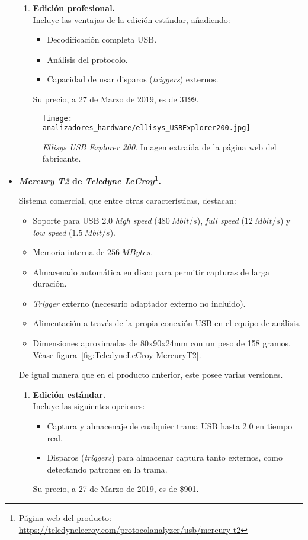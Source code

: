 \begin{itemize}
\begin{enumerate}
        \item \textbf{Edición profesional.} \\
        Incluye las ventajas de la edición estándar, añadiendo:
        \begin{itemize}
            \item Decodificación completa USB.
            \item Análisis del protocolo.
            \item Capacidad de usar disparos (\emph{triggers}) externos.
        \end{itemize}
        Su precio, a 27 de Marzo de 2019, es de 3199\texteuro.
    \end{enumerate}    
    \begin{figure}[htb]
        \centering
        \texttt{[image: analizadores\_hardware/ellisys\_USBExplorer200.jpg]}
        \caption{\emph{Ellisys USB Explorer 200}. Imagen extraída de la página web del fabricante.}
        \label{fig:ellisys-Explorer200}
    \end{figure}
    
    \item \textbf{\emph{Mercury T2} de \emph{Teledyne LeCroy}\footnote{Página web del producto: \url{https://teledynelecroy.com/protocolanalyzer/usb/mercury-t2}}.}
    
    Sistema comercial, que entre otras características\cite{teledynelecroy2014}, destacan:
    \begin{itemize}
        \item Soporte para USB 2.0 \emph{high speed} ($480~Mbit/s$), \emph{full speed} ($12~Mbit/s$) y \emph{low speed} ($1.5~Mbit/s$).
        \item Memoria interna de $256~MBytes$.
        \item Almacenado automática en disco para permitir capturas de larga duración.
        \item \emph{Trigger} externo (necesario adaptador externo no incluido).
        \item Alimentación a través de la propia conexión USB en el equipo de análisis.
        \item Dimensiones aproximadas de 80x90x24mm con un peso de 158 gramos. Véase figura~\ref{fig:TeledyneLeCroy-MercuryT2}.
    \end{itemize}
    
    De igual manera que en el producto anterior, este posee varias versiones.

    \begin{enumerate}
        \item \textbf{Edición estándar.} \\
        Incluye las siguientes opciones:
        \begin{itemize}
            \item Captura y almacenaje de cualquier trama USB hasta 2.0 en tiempo real.
            \item Disparos (\emph{triggers}) para almacenar captura tanto externos, como detectando patrones en la trama.
        \end{itemize}
        Su precio, a 27 de Marzo de 2019, es de \$901.
        

\end{enumerate}
\end{itemize}
